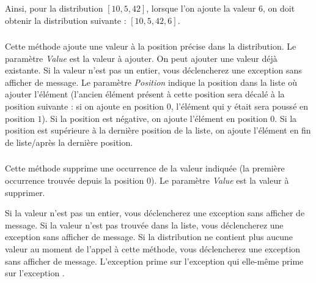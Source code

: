 \medskip

\noindent Ainsi, pour la distribution $ [ 10, 5, 42 ] $, lorsque l'on ajoute la valeur $ 6 $, on doit obtenir la distribution suivante : $ [ 10, 5, 42, 6 ] $.


\subsubsection*{}

\noindent Cette méthode ajoute une valeur à la position précise dans la distribution.
Le paramètre \textit{Value} est la valeur à ajouter.
On peut ajouter une valeur déjà existante.
Si la valeur n'est pas un entier, vous déclencherez une exception  sans afficher de message.
Le paramètre \textit{Position} indique la position dans la liste où ajouter l'élément (l'ancien élément présent à cette position sera décalé à la position suivante : si on ajoute en position $ 0 $, l'élément qui y était sera poussé en position $ 1 $).
Si la position est négative, on ajoute l'élément en position $ 0 $.
Si la position est supérieure à la dernière position de la liste, on ajoute l'élément en fin de liste/après la dernière position.


\subsubsection*{}

\noindent Cette méthode supprime une occurrence de la valeur indiquée (la première occurrence trouvée depuis la position $ 0 $).
Le paramètre \textit{Value} est la valeur à supprimer.

\noindent Si la valeur n'est pas un entier, vous déclencherez une exception  sans afficher de message.
Si la valeur n'est pas trouvée dans la liste, vous déclencherez une exception  sans afficher de message.
Si la distribution ne contient plus aucune valeur au moment de l'appel à cette méthode, vous déclencherez une exception  sans afficher de message.
L'exception  prime sur l'exception  qui elle-même prime sur l'exception .


\subsubsection*{}

